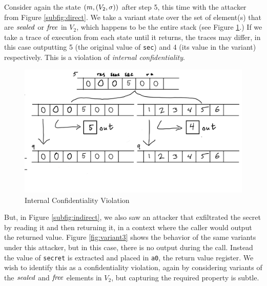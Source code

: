\documentclass[10pt,conference]{ieeetran}%
\theoremstyle{definition}
\begin{document}
Consider again the state \((m, (V_2,\sigma))\) after step 5, this time with the attacker from
Figure \ref{subfig:direct}. We take a variant state over the set of element(s) that are
\(\mathit{sealed}\) or \(\mathit{free}\) in \(V_2\), which happens to be the entire stack (see
Figure \ref{fig:variant2}.) If we take a trace of execution from each state until it returns,
the traces may differ, in this case outputting 5 (the original value of {\tt sec}) and
4 (its value in the variant) respectively. This is a violation of
{\it internal confidentiality}.

\begin{figure}
  \includegraphics[width=\columnwidth]{variants2.png}
  \caption{Internal Confidentiality Violation}
  \label{fig:variant2}
\end{figure}

But, in Figure \ref{subfig:indirect}, we also saw an attacker that exfiltrated the secret
by reading it and then returning it, in a context where the caller would output the returned
value. Figure \ref{fig:variant3} shows the behavior of the same variants under this attacker,
but in this case, there is no output during the call. Instead the value of {\tt secret} is
extracted and placed in {\tt a0}, the return value register. We wish to identify this as
a confidentiality violation, again by considering variants of the \(\mathit{sealed}\) and \(\mathit{free}\)
elements in \(V_2\), but capturing the required property is subtle.  
\end{document}
